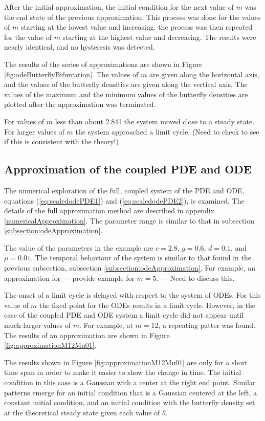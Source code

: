 \documentclass[review]{elsarticle}
\begin{document}
After the initial approximation, the initial condition for the next
value of $m$ was the end state of the previous approximation. This
process was done for the values of $m$ starting at the lowest value
and increasing. the process was then repeated for the value of $m$
starting at the highest value and decreasing. The results were nearly
identical, and no hysteresis was detected.

The results of the series of approximations are shown in Figure
\ref{fig:odeButterflyBifurcation}. The values of $m$ are given along
the horizontal axis, and the values of the butterfly densities are
given along the vertical axis. The values of the maximum and the
minimum values of the butterfly densities are plotted after the
approximation was terminated.

For values of $m$ less than about 2.841 the system moved close to a
steady state. For larger values of $m$ the system approached a limit
cycle. (Need to check to see if this is consistent with the theory!)

\subsection{Approximation of the coupled PDE and ODE}

The numerical exploration of the full, coupled system of the PDE and
ODE, equations (\ref{eq:scaledodePDE1}) and (\ref{eq:scaledodePDE2}),
is examined. The details of the full approximation method are
described in appendix \ref{numericalApproximation}. The parameter
range is similar to that in subsection
\ref{subsection:odeApproximation}.

The value of the parameters in the example are $c=2.8$, $g=0.6$,
$d=0.1$, and $\mu=0.01$. The temporal behaviour of the system is
similar to that found in the previous subsection, subsection
\ref{subsection:odeApproximation}. For example, an approximation for
--- provide example for $m=5$. --- Need to discuss this.

The onset of a limit cycle is delayed with respect to the system of
ODEs. For this value of $m$ the fixed point for the ODEs results in a
limit cycle. However, in the case of the coupled PDE and ODE system a
limit cycle did not appear until much larger values of $m$. For
example, at $m=12$, a repeating patter was found. The results of an
approximation are shown in Figure \ref{fig:approximationM12Mu01}.

The results shown in Figure \ref{fig:approximationM12Mu01} are only
for a short time span in order to make it easier to show the change in
time. The initial condition in this case is a Gaussian with a center
at the right end point.  Similar patterns emerge for an initial
condition that is a Gaussian centered at the left, a constant initial
condition, and an initial condition with the butterfly density set at
the theoretical steady state given each value of $\theta$.
\end{document}
